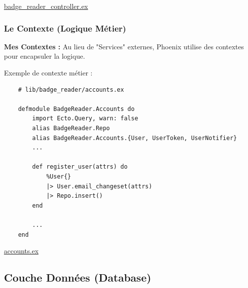 \href{https://github.com/Theoden-bernard/badge_reader_project/blob/main/badge_reader/lib/badge_reader_web/controllers/badge_reader_controller.ex}{\newline badge\_reader\_controller.ex}

\subsubsection{Le Contexte (Logique Métier)}

\textbf{Mes Contextes :} Au lieu de "Services" externes, Phoenix utilise des contextes pour encapsuler la logique.
\newline

\begin{for_you}{Exemple de contexte métier :}
    \begin{lstlisting}
    # lib/badge_reader/accounts.ex

    defmodule BadgeReader.Accounts do
        import Ecto.Query, warn: false
        alias BadgeReader.Repo
        alias BadgeReader.Accounts.{User, UserToken, UserNotifier}    
        ...

        def register_user(attrs) do
            %User{}
            |> User.email_changeset(attrs)
            |> Repo.insert()
        end
        
        ...
    end
    \end{lstlisting}
\end{for_you}

\href{https://github.com/Theoden-bernard/badge_reader_project/blob/main/badge_reader/lib/badge_reader/accounts.ex}{\newline accounts.ex}

\subsection{Couche Données (Database)}

